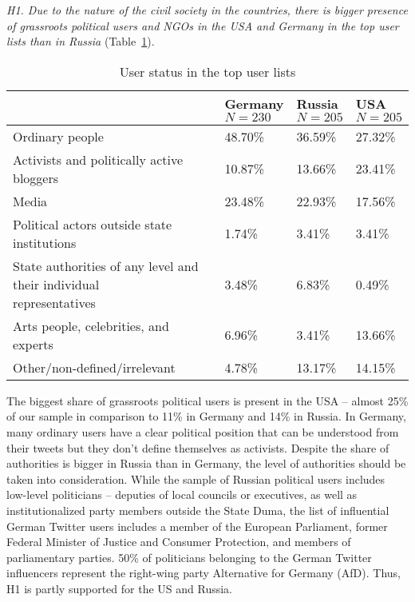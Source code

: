 \textit{H1. Due to the nature of the civil society in the countries, there is bigger presence of grassroots political users and NGOs in the USA and Germany in the top user lists than in Russia} (Table~\cref{tab:topTierListUserStatus}).

\begin{table}[ht]%
	\centering
	\caption{User status in the top user lists}%
	\label{tab:topTierListUserStatus}%
	\begin{adjustbox}{width=1\textwidth}
		\small
		\begin{tabular}{ l  l  l  l }%
			\toprule
			& \makecell[l]{Germany\\\(N=230\)} & \makecell[l]{Russia\\\(N=205\)} & \makecell[l]{USA\\\(N=205\)}\\
			\hline
			Ordinary people & 48.70\% & 36.59\% & 27.32\% \\
			Activists and politically active bloggers & 10.87\% & 13.66\% & 23.41\% \\
			Media & 23.48\% & 22.93\% & 17.56\% \\
			Political actors outside state institutions & 1.74\% & 3.41\% & 3.41\% \\
			\makecell[l]{State authorities of any level and their individual\\representatives} & 3.48\% & 6.83\% & 0.49\%\\
			Arts people, celebrities, and experts & 6.96\% & 3.41\% & 13.66\% \\
			Other/non-defined/irrelevant & 4.78\% & 13.17\% & 14.15\% \\ 
			\bottomrule
		\end{tabular}%
	\end{adjustbox}
\end{table}

The biggest share of grassroots political users is present in the USA -- almost 25\% of our sample in comparison to 11\% in Germany and 14\% in Russia. In Germany, many ordinary users have a clear political position that can be understood from their tweets but they don’t define themselves as activists. Despite the share of authorities is bigger in Russia than in Germany, the level of authorities should be taken into consideration. While the sample of Russian political users includes low-level politicians -- deputies of local councils or executives, as well as institutionalized party members outside the State Duma, the list of influential German Twitter users includes a member of the European Parliament, former Federal Minister of Justice and Consumer Protection, and members of parliamentary parties. 50\% of politicians belonging to the German Twitter influencers represent the right-wing party Alternative for Germany (AfD). Thus, H1 is partly supported for the US and Russia.

